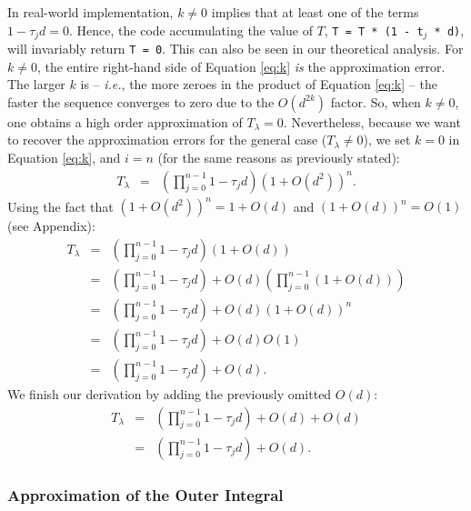 In real-world implementation, $k \neq 0$ implies that at least one of the terms $1 - \tau_j d = 0$. Hence, the code accumulating the value of $T$,
\texttt{T = T * (1 - t$_j$ * d)},
will invariably return \texttt{T = 0}. This can also be seen in our theoretical analysis. For $k \neq 0$, the entire right-hand side of Equation \eqref{eq:k} \emph{is} the approximation error. The larger $k$ is -- \emph{i.e.}, the more zeroes in the product of Equation \eqref{eq:k} --  the faster the sequence converges to zero due to the $O(d^{2k})$ factor. So, when $k \neq 0$, one obtains a high order approximation of $T_\lambda = 0$. Nevertheless, because we want to recover the approximation errors for the general case ($T_\lambda \neq 0$), we set $k = 0$ in Equation \eqref{eq:k}, and $i = n$ (for the same reasons as previously stated):
\begin{eqnarray}
T_\lambda
& = &\left( \prod_{j = 0}^{n-1} 1 - \tau_jd \right) (1 + O(d^2) )^{n}.
\end{eqnarray}
%
Using the fact that $(1 + O(d^2) )^{n} = 1 + O(d)$ and $(1 + O(d) )^{n} = O(1)$ (see Appendix):
\begin{eqnarray}
T_\lambda
& = &\left( \prod_{j = 0}^{n-1} 1 - \tau_jd \right) (1 + O(d))\\
& = &\left( \prod_{j = 0}^{n-1} 1 - \tau_jd \right)  +  O(d)\left( \prod_{j = 0}^{n-1} (1 + O(d)) \right) \\
& = &\left( \prod_{j = 0}^{n-1} 1 - \tau_jd \right)  +  O(d)(1 + O(d))^n \\
& = &\left( \prod_{j = 0}^{n-1} 1 - \tau_jd \right) + O(d)O(1) \\
& = &\left( \prod_{j = 0}^{n-1} 1 - \tau_jd \right) + O(d).
\end{eqnarray}
We finish our derivation by adding the previously omitted $O(d)$:
\begin{eqnarray}
T_\lambda
& = &\left( \prod_{j = 0}^{n-1} 1 - \tau_jd \right) + O(d) + O(d)\\
& = &\left( \prod_{j = 0}^{n-1} 1 - \tau_jd \right) + O(d).
\end{eqnarray}

\subsubsection{Approximation of the Outer Integral}


